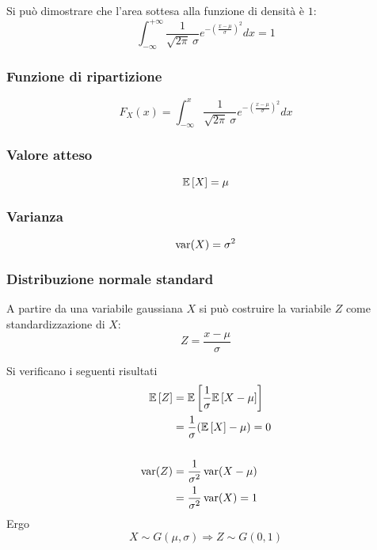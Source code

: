 Si può dimostrare che l'area sottesa alla funzione di densità è $1$:
\begin{equation*}
	\int_{-\infty}^{+\infty} \frac{1}{\sqrt{2\pi}~\sigma} e^{-\left(\frac{x-\mu}{\sigma}\right)^2} dx = 1
\end{equation*}


\subsubsection{Funzione di ripartizione}
\begin{equation*}
	F_X(x) = \int_{-\infty}^x \frac{1}{\sqrt{2\pi}~\sigma} e^{-\left(\frac{x-\mu}{\sigma}\right)^2} dx
\end{equation*}


\subsubsection{Valore atteso}
\begin{equation*}
	\mathbb{E}\left[ X \right] = \mu
\end{equation*}


\subsubsection{Varianza}
\begin{equation*}
	\operatorname{var}(X) = \sigma^2
\end{equation*}


\subsubsection{Distribuzione normale standard}
A partire da una variabile gaussiana $X$ si può costruire la variabile $Z$ come standardizzazione di $X$:
\begin{equation*}
	Z = \frac{x-\mu}{\sigma}
\end{equation*}

\noindent
Si verificano i seguenti risultati
\begin{align*}
	\mathbb{E}\left[ Z \right]  & = \mathbb{E}\left[ \frac{1}{\sigma}\mathbb{E}\left[ X-\mu \right] \right]  \\
	        & = \frac{1}{\sigma}(\mathbb{E}\left[ X \right]-\mu) = 0 \\
	\\
	\operatorname{var}(Z) & = \frac{1}{\sigma^2} \operatorname{var}(X-\mu)   \\
	        & = \frac{1}{\sigma^2}\operatorname{var}(X) = 1
\end{align*}
Ergo
\begin{equation*}
	X\sim G(\mu,\sigma) \Rightarrow Z\sim G(0,1)
\end{equation*}

